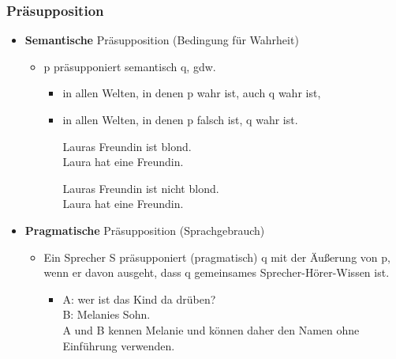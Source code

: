 
\begin{frame}
\frametitle{Präsupposition}

\begin{itemize}
	\item \textbf{Semantische} Präsupposition  (Bedingung für Wahrheit)
	
	\begin{itemize}
		\item p präsupponiert semantisch q, gdw.

		\begin{itemize}
			\item in allen Welten, in denen p wahr ist, auch q wahr ist,
			\item in allen Welten, in denen p falsch ist, q wahr ist.
			
			\ea Lauras Freundin ist blond. \\
			\implc Laura hat eine Freundin.
			\z
			
			\ea Lauras Freundin ist nicht blond. \\
			\implc Laura hat eine Freundin.
			\z
			
		\end{itemize}

	\end{itemize}
	
	\item \textbf{Pragmatische} Präsupposition (Sprachgebrauch)
	
	\begin{itemize}
		\item Ein Sprecher S präsupponiert (pragmatisch) q mit der Äu\ss{}erung von p, wenn er davon ausgeht, dass q gemeinsames Sprecher-Hörer-Wissen ist.
		
		\begin{itemize}
		\item[]
			
		\ea A: wer ist das Kind da drüben? \\
			   B: Melanies Sohn. \\
			   \implc A und B kennen Melanie und können daher den Namen ohne Einführung verwenden.
		\z
		
		\end{itemize}
	
		\end{itemize}
	
\end{itemize}

\end{frame}



